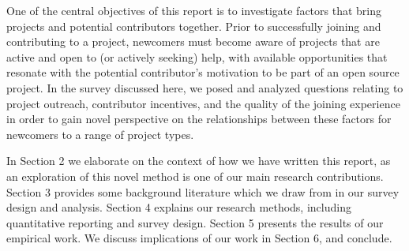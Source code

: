One of the central objectives of this report is to investigate factors that bring projects and potential contributors together. Prior to successfully joining and contributing to a project, newcomers must become aware of projects that are active and open to (or actively seeking) help, with available opportunities that resonate with the potential contributor's motivation to be part of an open source project. In the survey discussed here, we posed and analyzed questions relating to project outreach, contributor incentives, and the quality of the joining experience in order to gain novel perspective on the relationships between these factors for newcomers to a range of project types.


In Section 2 we elaborate on the context of how we have written this report, as an exploration of this novel method is one of our main research contributions.
Section 3 provides some background literature which we draw from in
our survey design and analysis.
Section 4 explains our research methods, including quantitative
reporting and survey design.
Section 5 presents the results of our empirical work.
We discuss implications of our work in Section 6, and conclude. 


